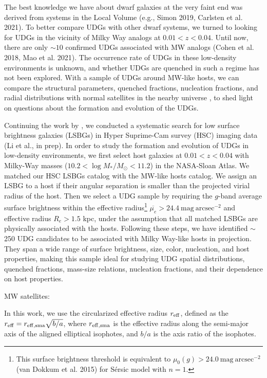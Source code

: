 \documentclass[twocolumn,astrosymb,twocolappendix]{aastex631}
\begin{document}
\begin{CJK*}{UTF8}{gbsn}
The best knowledge we have about dwarf galaxies at the very faint end was derived from systems in the Local Volume (e.g., Simon 2019, Carlsten et al. 2021). To better compare UDGs with other dwarf systems, we turned to looking for UDGs in the vicinity of Milky Way analogs at $0.01 < z < 0.04$. Until now, there are only $\sim 10$ confirmed UDGs associated with MW analogs (Cohen et al. 2018, Mao et al. 2021). The occurrence rate of UDGs in these low-density environments is unknown, and whether UDGs are quenched in such a regime has not been explored. With a sample of UDGs around MW-like hosts, we can compare the structural parameters, quenched fractions, nucleation fractions, and radial distributions with normal satellites in the nearby universe \citep[e.g.,][]{SAGA-II,CarlstenELVES2022}, to shed light on questions about the formation and evolution of the UDGs.


Continuing the work by \citep{Greco2018}, we conducted a systematic search for low surface brightness galaxies (LSBGs) in Hyper Suprime-Cam survey (HSC) imaging data (Li et al., in prep). In order to study the formation and evolution of UDGs in low-density environments, we first select host galaxies at $0.01 < z < 0.04$ with Milky-Way masses ($10.2 < \log M_*/M_\odot < 11.2$) in the NASA-Sloan Atlas. We matched our HSC LSBGs catalog with the MW-like hosts catalog. We assign an LSBG to a host if their angular separation is smaller than the projected virial radius of the host. Then we select a UDG sample by requiring the $g$-band average surface brightness within the effective radius\footnote{This surface brightness threshold is equivalent to $\mu_0(g) > 24.0\ \mathrm{mag\ arcsec^{-2}}$ (van Dokkum et al. 2015) for S\'{e}rsic model with $n=1$.} $\overline{\mu_e} > 24.4\ \mathrm{mag\ arcsec^{-2}}$ and effective radius $R_e > 1.5$ kpc, under the assumption that all matched LSBGs are physically associated with the hosts. Following these steps, we have identified $\sim$ 250 UDG candidates to be associated with Milky Way-like hosts in projection. They span a wide range of surface brightness, size, color, nucleation, and host properties, making this sample ideal for studying UDG spatial distributions, quenched fractions, mass-size relations, nucleation fractions, and their dependence on host properties.


MW satellites: \citep{Nashimoto2022}

In this work, we use the circularized effective radius $r_{\rm eff}$, defined as the $r_{\rm eff} = r_{\rm eff, sma} \sqrt{b/a}$, where $r_{\rm eff, sma}$ is the effective radius along the semi-major axis of the aligned elliptical isophotes, and $b/a$ is the axis ratio of the isophotes.


\end{CJK*}
\end{document}
